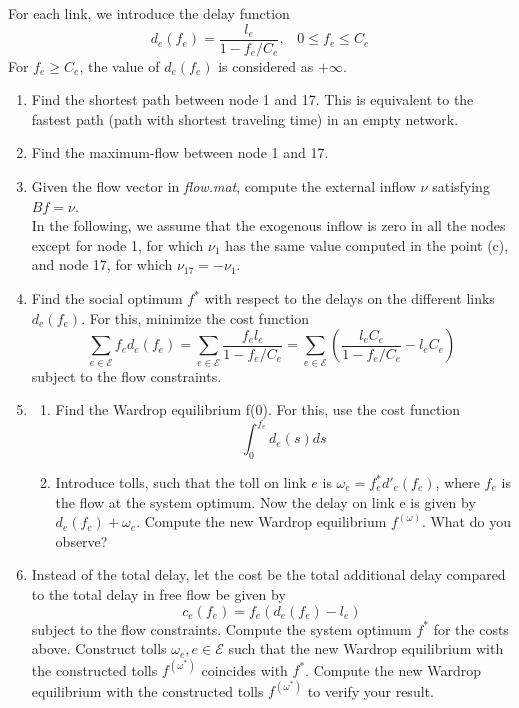 \documentclass[
	12pt, %
]{fphw}
\begin{document}
For each link, we introduce the delay function
    \begin{equation}\label{eq:delayEq}
        d_e(f_e) = \frac{l_e}{1 - f_e/C_e}, \hspace{10pt} 0 \leq f_e \leq C_e
    \end{equation}
For $f_e \geq C_e$, the value of $d_e(f_e)$ is considered as $+\infty$.
\smallskip
\begin{enumerate}[(a\normalfont)] %
		\item Find the shortest path between node 1 and 17. This is equivalent to the fastest path (path with shortest traveling time) in an empty network.
		\item Find the maximum-flow between node 1 and 17.
		\item Given the flow vector in \emph{flow.mat}, compute the external inflow $\nu$ satisfying $B f = \nu$.\\
		In the following, we assume that the exogenous inflow is zero in all the nodes except for node 1, for which $\nu_1$ has the same value computed in the point (c), and node 17, for which $\nu_{17} = - \nu_1$.
		\item Find the social optimum $f^*$ with respect to the delays on the different links $d_e(f_e)$. For this, minimize the cost function
		$$ 
		    \sum_{e \in \mathcal{E}} f_e d_e(f_e) = \sum_{e \in \mathcal{E}} \frac{f_e l_e}{1 - f_e/C_e} = \sum_{e \in \mathcal{E}} \left( \frac{l_e C_e}{1 - f_e/C_e} - l_e C_e \right)
		$$
		subject to the flow constraints.
		\item 
		    \begin{enumerate}[1.]
		        \item Find the Wardrop equilibrium f(0). For this, use the cost function
        		$$
        		    \int_{0}^{f_e} d_e(s) ds
        		$$
        		\item Introduce tolls, such that the toll on link $e$ is $\omega_e = f_e^* d'_e(f_e)$, where $f_e$ is the flow at the system optimum. Now the delay on link e is given by $d_e(f_e)+\omega_e$. Compute the new Wardrop equilibrium $f^{(\omega)}$. What do you observe?
		\end{enumerate}
		\item Instead of the total delay, let the cost be the total additional delay compared to the total delay in free flow be given by
		$$
		    c_e(f_e) = f_e(d_e(f_e) - l_e)
		$$
		subject to the flow constraints. Compute the system optimum $f^*$ for the costs above. Construct tolls $\omega_e, e \in \mathcal{E}$ such that the new Wardrop equilibrium with the constructed tolls $f^{(\omega^*)}$ coincides with $f^{*}$. Compute the new Wardrop equilibrium with the constructed tolls $f^{(\omega^*)}$ to verify your result.
	\end{enumerate}
\end{document}
